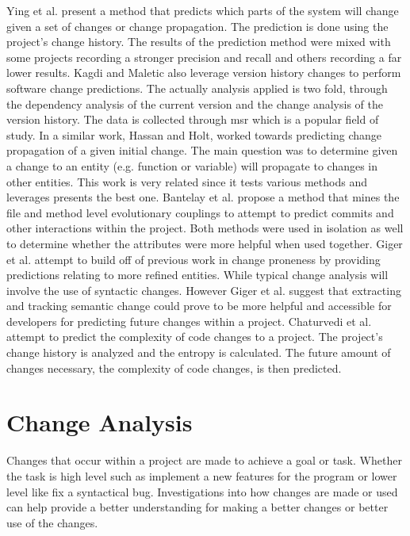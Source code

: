 Ying et al. present a method that predicts which parts of the system will change given a set of changes or change propagation. The prediction is done using the project's change history. The results of the prediction method were mixed with some projects recording a stronger precision and recall and others recording a far lower results. Kagdi and Maletic also leverage version history changes to perform software change predictions. The actually analysis applied is two fold, through the dependency analysis of the current version and the change analysis of the version history. The data is collected through \gls{msr} which is a popular field of study. In a similar work, Hassan and Holt, worked towards predicting change propagation of a given initial change. The main question was to determine given a change to an entity (e.g. function or variable) will propagate to changes in other entities. This work is very related since it tests various methods and leverages presents the best one. Bantelay et al. propose a method that mines the file and method level evolutionary couplings to attempt to predict commits and other interactions within the project. Both methods were used in isolation as well to determine whether the attributes were more helpful when used together. Giger et al. attempt to build off of previous work in change proneness by providing predictions relating to more refined entities. While typical change analysis will involve the use of syntactic changes. However Giger et al. suggest that extracting and tracking semantic change could prove to be more helpful and accessible for developers for predicting future changes within a project. Chaturvedi et al. attempt to predict the complexity of code changes to a project. The project's change history is analyzed and the entropy is calculated. The future amount of changes necessary, the complexity of code changes, is then predicted. 


\section{Change Analysis}

Changes that occur within a project are made to achieve a goal or task. Whether the task is high level such as implement a new features for the program or lower level like fix a syntactical bug. Investigations into how changes are made or used can help provide a better understanding for making a better changes or better use of the changes.

